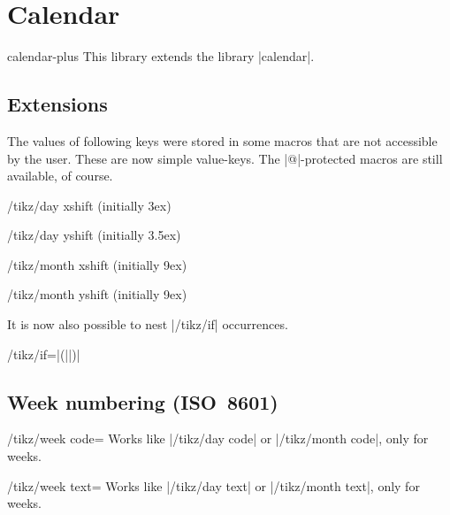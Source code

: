 %
%
%

\section{Calendar}
\begin{tikzlibrary}{calendar-plus}
  This library extends the \tikzname\space library |calendar|.
\end{tikzlibrary}

\subsection{Extensions}

The values of following keys were stored in some macros that are not
accessible by the user. These are now simple value-keys.
The |@|-protected macros are still available, of course.

\begin{key}{/tikz/day xshift (initially 3ex)}
\end{key}
\begin{key}{/tikz/day yshift (initially 3.5ex)}
\end{key}
\begin{key}{/tikz/month xshift (initially 9ex)}
\end{key}
\begin{key}{/tikz/month yshift (initially 9ex)}
\end{key}

It is now also possible to nest |/tikz/if| occurrences.
\begin{key}{/tikz/if=|(||)|}
\end{key}

\subsection{Week numbering (ISO~8601)}

\begin{key}{/tikz/week code=}
  Works like |/tikz/day code| or |/tikz/month code|, only for weeks.
\end{key}

\begin{key}{/tikz/week text=}
  Works like |/tikz/day text| or |/tikz/month text|, only for weeks.
\end{key}

